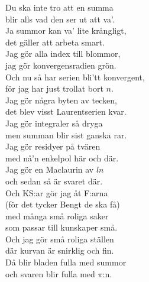 \documentclass[a6paper, 10pt, twoside]{article}
\begin{document}
\noindent
\begin{center}
\end{center}
\begin{lyrics}
Du ska inte tro att en summa \\
blir alls vad den ser ut att va'. \\
Ja summor kan va' lite krångligt, \\
det gäller att arbeta smart. 
\vspace{5pt} \\
Jag gör alla index till blommor, \\
jag gör konvergensradien grön. \\
Och nu så har serien bli'tt konvergent, \\
för jag har just trollat bort $n$. 
\vspace{5pt} \\
Jag gör några byten av tecken, \\
det blev visst Laurentserien kvar. \\
Jag gör integraler så dryga \\
men summan blir sist ganska rar. 
\vspace{5pt} \\
Jag gör residyer på tvären \\
med nå'n enkelpol här och där. \\
Jag gör en Maclaurin av $ln$ \\
och sedan så är svaret där. 
\vspace{5pt} \\
Och KS:ar gör jag åt F:arna \\
(för det tycker Bengt de ska få) \\
med många små roliga saker \\
som passar till kunskaper små. 
\vspace{5pt} \\
Och jag gör små roliga ställen \\
där kurvan är snirklig och fin. \\
Då blir bladen fulla med summor \\
och svaren blir fulla med $\pi$:n.
\end{lyrics}
\end{document}
